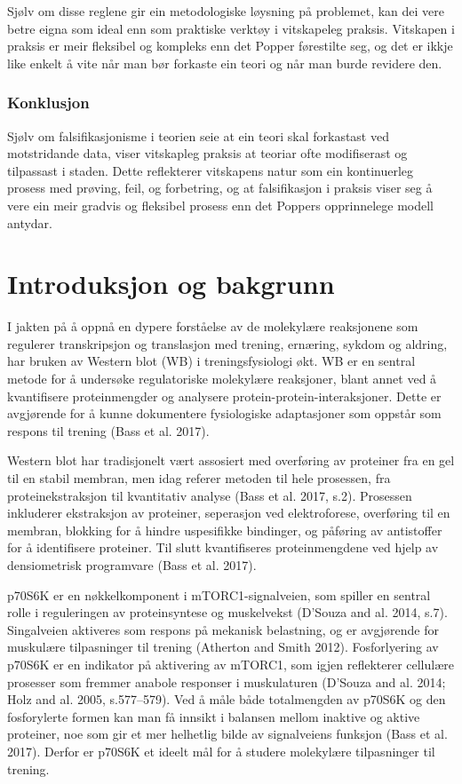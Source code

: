 \documentclass[
  letterpaper,
  DIV=11,
  numbers=noendperiod]{scrreprt}
\begin{document}
Sjølv om disse reglene gir ein metodologiske løysning på problemet, kan
dei vere betre eigna som ideal enn som praktiske verktøy i vitskapeleg
praksis. Vitskapen i praksis er meir fleksibel og kompleks enn det
Popper førestilte seg, og det er ikkje like enkelt å vite når man bør
forkaste ein teori og når man burde revidere den.

\subsection{Konklusjon}\label{konklusjon-2}

Sjølv om falsifikasjonisme i teorien seie at ein teori skal forkastast
ved motstridande data, viser vitskapleg praksis at teoriar ofte
modifiserast og tilpassast i staden. Dette reflekterer vitskapens natur
som ein kontinuerleg prosess med prøving, feil, og forbetring, og at
falsifikasjon i praksis viser seg å vere ein meir gradvis og fleksibel
prosess enn det Poppers opprinnelege modell antydar.


\chapter{Introduksjon og bakgrunn}\label{introduksjon-og-bakgrunn}

I jakten på å oppnå en dypere forståelse av de molekylære reaksjonene
som regulerer transkripsjon og translasjon med trening, ernæring, sykdom
og aldring, har bruken av Western blot (WB) i treningsfysiologi økt. WB
er en sentral metode for å undersøke regulatoriske molekylære
reaksjoner, blant annet ved å kvantifisere proteinmengder og analysere
protein-protein-interaksjoner. Dette er avgjørende for å kunne
dokumentere fysiologiske adaptasjoner som oppstår som respons til
trening (Bass et al. 2017).

Western blot har tradisjonelt vært assosiert med overføring av proteiner
fra en gel til en stabil membran, men idag referer metoden til hele
prosessen, fra proteinekstraksjon til kvantitativ analyse (Bass et al.
2017, s.2). Prosessen inkluderer ekstraksjon av proteiner, seperasjon
ved elektroforese, overføring til en membran, blokking for å hindre
uspesifikke bindinger, og påføring av antistoffer for å identifisere
proteiner. Til slutt kvantifiseres proteinmengdene ved hjelp av
densiometrisk programvare (Bass et al. 2017).

p70S6K er en nøkkelkomponent i mTORC1-signalveien, som spiller en
sentral rolle i reguleringen av proteinsyntese og muskelvekst (D'Souza
and al. 2014, s.7). Singalveien aktiveres som respons på mekanisk
belastning, og er avgjørende for muskulære tilpasninger til trening
(Atherton and Smith 2012). Fosforlyering av p70S6K er en indikator på
aktivering av mTORC1, som igjen reflekterer cellulære prosesser som
fremmer anabole responser i muskulaturen (D'Souza and al. 2014; Holz and
al. 2005, s.577--579). Ved å måle både totalmengden av p70S6K og den
fosforylerte formen kan man få innsikt i balansen mellom inaktive og
aktive proteiner, noe som gir et mer helhetlig bilde av signalveiens
funksjon (Bass et al. 2017). Derfor er p70S6K et ideelt mål for å
studere molekylære tilpasninger til trening.
\end{document}
